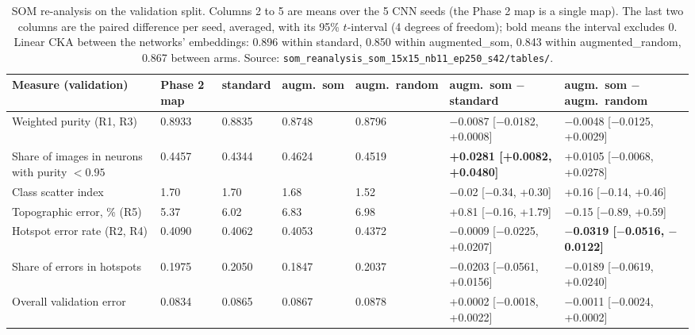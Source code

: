 \documentclass[11pt]{article}
\begin{document}
\begin{table}[H]
\centering
\renewcommand{\arraystretch}{1.12}
\footnotesize
{\setlength{\tabcolsep}{3pt}\begin{tabular}{|>{\raggedright\arraybackslash}p{}|C{0.08\textwidth}|C{0.085\textwidth}|C{0.09\textwidth}|C{0.095\textwidth}|C{0.18\textwidth}|C{0.18\textwidth}|}
\hline
\textbf{Measure (validation)} & \textbf{Phase 2 map} & \textbf{standard} & \textbf{augm.\ som} & \textbf{augm.\ random} & \textbf{augm.\ som $-$ standard} & \textbf{augm.\ som $-$ augm.\ random} \\ \hline
Weighted purity (R1, R3) & 0.8933 & 0.8835 & 0.8748 & 0.8796 & $-$0.0087 [$-$0.0182, +0.0008] & $-$0.0048 [$-$0.0125, +0.0029] \\ \hline
Share of images in neurons with purity $<0.95$ & 0.4457 & 0.4344 & 0.4624 & 0.4519 & \textbf{+0.0281 [+0.0082, +0.0480]} & +0.0105 [$-$0.0068, +0.0278] \\ \hline
Class scatter index & 1.70 & 1.70 & 1.68 & 1.52 & $-$0.02 [$-$0.34, +0.30] & +0.16 [$-$0.14, +0.46] \\ \hline
Topographic error, \% (R5) & 5.37 & 6.02 & 6.83 & 6.98 & +0.81 [$-$0.16, +1.79] & $-$0.15 [$-$0.89, +0.59] \\ \hline
Hotspot error rate (R2, R4) & 0.4090 & 0.4062 & 0.4053 & 0.4372 & $-$0.0009 [$-$0.0225, +0.0207] & \textbf{$-$0.0319 [$-$0.0516, $-$0.0122]} \\ \hline
Share of errors in hotspots & 0.1975 & 0.2050 & 0.1847 & 0.2037 & $-$0.0203 [$-$0.0561, +0.0156] & $-$0.0189 [$-$0.0619, +0.0240] \\ \hline
Overall validation error & 0.0834 & 0.0865 & 0.0867 & 0.0878 & +0.0002 [$-$0.0018, +0.0022] & $-$0.0011 [$-$0.0024, +0.0002] \\ \hline
\end{tabular}}
\caption{SOM re-analysis on the validation split. Columns 2 to 5 are means over the 5 CNN seeds (the Phase 2 map is a single map). The last two columns are the paired difference per seed, averaged, with its 95\% $t$-interval (4 degrees of freedom); bold means the interval excludes 0. Linear CKA between the networks' embeddings: 0.896 within standard, 0.850 within augmented\_som, 0.843 within augmented\_random, 0.867 between arms. Source: \texttt{som\_reanalysis\_som\_15x15\_nb11\_ep250\_s42/tables/}.}
\label{tab:reanalysis}
\end{table}
\end{document}
